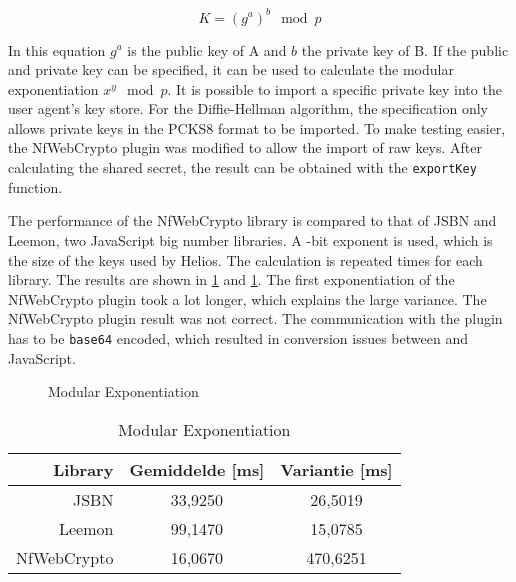 \begin{equation}
  \label{eq:wc:diffie_hellman}
  K = (g^a)^b \mod{p}
\end{equation}

\par In this equation $g^a$ is the public key of A and $b$ the private key of B. If the public and private key can be specified, it can be used to calculate the modular exponentiation $x^y \mod{p}$. It is possible to import a specific private key into the user agent's key store. For the Diffie-Hellman algorithm, the specification only allows private keys in the PCKS8 format to be imported. To make testing easier, the NfWebCrypto plugin was modified to allow the import of raw keys. After calculating the shared secret, the result can be obtained with the \texttt{exportKey} function.

\par The performance of the NfWebCrypto library is compared to that of JSBN and Leemon, two JavaScript big number libraries.\cite{site:wu_rsa_and_ecc_in_javascript}\cite{site:baird_big_integers_in_javascript} A -bit exponent is used, which is the size of the keys used by Helios. The calculation is repeated  times for each library. The results are shown in \ref{fig:wc:modular_exponentiation} and \ref{tab:wc:modular_exponentiation}. The first exponentiation of the NfWebCrypto plugin took a lot longer, which explains the large variance. The NfWebCrypto plugin result was not correct. The communication with the plugin has to be \texttt{base64} encoded, which resulted in conversion issues between \cplusplus and JavaScript.

\begin{figure}
  \caption{Modular Exponentiation}
  \label{fig:wc:modular_exponentiation}
\end{figure}

\begin{table}
  \begin{center}
    \begin{tabular}{r | c c}
      Library & Gemiddelde [ms] & Variantie [ms] \\ \hline
      JSBN & 33,9250 & 26,5019  \\
      Leemon & 99,1470 & 15,0785 \\
      NfWebCrypto & 16,0670 & 470,6251
    \end{tabular}
    \caption{Modular Exponentiation}
    \label{tab:wc:modular_exponentiation}
  \end{center}
\end{table}

